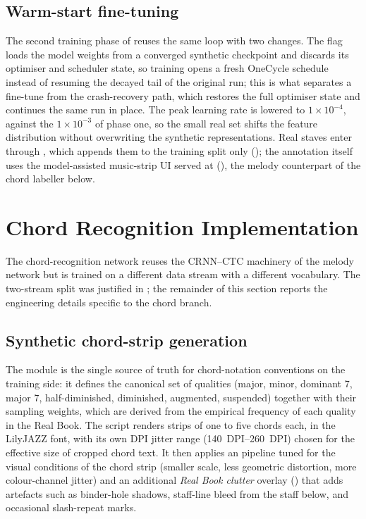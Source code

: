 \subsection{Warm-start fine-tuning}
\label{sec:impl-finetune}

The second training phase of  reuses the same
loop with two changes.  The  flag loads the model
weights from a converged synthetic checkpoint and discards its optimiser
and scheduler state, so training opens a fresh OneCycle schedule instead
of resuming the decayed tail of the original run; this is what separates
a fine-tune from the crash-recovery  path, which restores
the full optimiser state and continues the same run in place.  The peak
learning rate is lowered to $1{\times}10^{-4}$, against the
$1{\times}10^{-3}$ of phase one, so the small real set shifts the feature
distribution without overwriting the synthetic representations.  Real
staves enter through , which appends them to
the training split only (); the annotation
itself uses the model-assisted music-strip UI served at
 (), the melody counterpart of
the chord labeller below.

\section{Chord Recognition Implementation}
\label{sec:impl-chord}

The chord-recognition network reuses the CRNN--CTC machinery of the
melody network but is trained on a different data stream with a
different vocabulary.
The two-stream split was justified in ; the
remainder of this section reports the engineering details specific to
the chord branch.

\subsection{Synthetic chord-strip generation}

The  module is the single source of truth for
chord-notation conventions on the training side: it defines the
canonical set of qualities (major, minor, dominant 7, major 7,
half-diminished, diminished, augmented, suspended) together with their
sampling weights, which are derived from the empirical frequency of
each quality in the Real Book.
The  script renders strips of one to five
chords each, in the LilyJAZZ font, with its own DPI jitter range
(\SIrange{140}{260}{DPI}) chosen for the effective size of cropped
chord text. It then applies an  pipeline tuned for
the visual conditions of the chord strip (smaller scale, less
geometric distortion, more colour-channel jitter) and an additional
\textit{Real Book clutter} overlay
() that adds artefacts such as
binder-hole shadows, staff-line bleed from the staff below, and
occasional slash-repeat marks.

